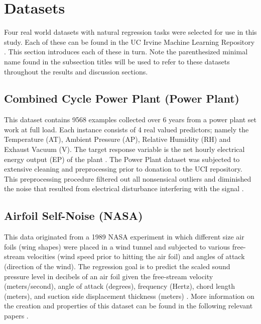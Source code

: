 \documentclass[9pt, conference]{IEEEtran}
\begin{document}
\section{Datasets}
\label{sec:datasets}
Four real world datasets with natural regression tasks were selected for use in this study. Each of these can be found in the UC Irvine Machine Learning Repository \cite{Lichman:2013}. This section introduces each of these in turn. Note the parenthesized minimal name found in the subsection titles will be used to refer to these datasets throughout the results and discussion sections.

\subsection{Combined Cycle Power Plant (Power Plant)}
This dataset contains 9568 examples collected over 6 years from a power plant set work at full load. Each instance consists of 4 real valued predictors; namely the  Temperature (AT), Ambient Pressure (AP), Relative Humidity (RH) and Exhaust Vacuum (V). The target response variable is the net hourly electrical energy output (EP) of the plant \cite{powerPlantDataset}. The Power Plant dataset was subjected to extensive cleaning and preprocessing prior to donation to the UCI repository. This preprocessing procedure filtered out all nonsensical outliers and diminished the noise that resulted from electrical disturbance interfering with the signal \cite{powerPlantCiteRequest1} \cite{powerPlantCiteRequest2}.

\subsection{Airfoil Self-Noise (NASA)}
This data originated from a 1989 NASA experiment in which different size air foils (wing shapes) were placed in a wind tunnel and subjected to various free-stream velocities (wind speed prior to hitting the air foil) and angles of attack (direction of the wind). The regression goal is to predict the scaled sound pressure level in decibels of an air foil given the free-stream velocity (meters/second), angle of attack (degrees), frequency (Hertz), chord length (meters), and suction side displacement thickness (meters) \cite{airFoilDataset}. More information on the creation and properties of this dataset can be found in the following relevant papers \cite{nasaCiteRequest1} \cite{nasaCiteRequest2} \cite{nasaCiteRequest3}.
\end{document}
